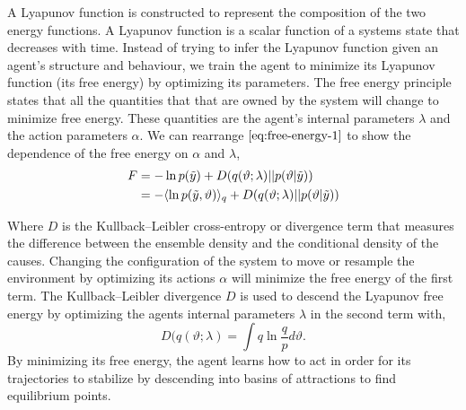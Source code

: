 \documentclass{article}
\begin{document}
A Lyapunov function is constructed to represent the composition of the two energy functions. A Lyapunov function is a scalar function of a systems state that decreases with time. Instead of trying to infer the Lyapunov function given an agent's structure and behaviour, we train the agent to minimize its Lyapunov function (its free energy) by optimizing its parameters. The free energy principle states that all the quantities that that are owned by the system will change to minimize free energy. These quantities are the agent's internal parameters $\lambda$ and the action parameters $\alpha$. We can rearrange $\eqref{eq:free-energy-1}$ to show the dependence of the free energy on $\alpha$ and $\lambda$,
\begin{align}\label{eq:free-energy-2}
\begin{split}
F &= -\ln p (\Tilde{y}) + D(q(\vartheta;\lambda) || p(\vartheta|\Tilde{y}))\\
&=  - \langle \ln p(\Tilde{y},\vartheta) \rangle_q + D(q(\vartheta;\lambda) || p(\vartheta|\Tilde{y}))
\end{split}
\end{align}

Where $D$ is the Kullback–Leibler cross-entropy or divergence term that measures the difference between the ensemble density and the conditional density of the causes. Changing the configuration of the system to move or resample the environment by optimizing its actions $\alpha$ will minimize the free energy of the first term. The Kullback–Leibler divergence $D$ is used to descend the Lyapunov free energy by optimizing the agents internal parameters $\lambda$ in the second term with,
\[
D(q(\vartheta;\lambda) = \int q \ln \frac{q}{p} d\vartheta.
\]
By minimizing its free energy, the agent learns how to act in order for its trajectories to stabilize by descending into basins of attractions to find equilibrium points.




\end{document}
